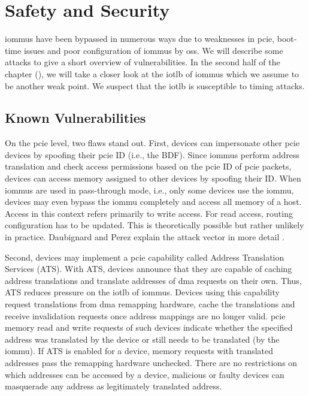\chapter{Safety and Security}
\label{chap:safety_and_security}

\acp{iommu} have been bypassed in numerous ways due to weaknesses in \ac{pcie},
boot-time issues and poor configuration of \acp{iommu} by \acp{os}. We will
describe some attacks to give a short overview of vulnerabilities. In the second
half of the chapter (), we will take a closer look at the
\ac{iotlb} of \acp{iommu} which we assume to be another weak point. We suspect
that the \ac{iotlb} is susceptible to timing attacks.


\section{Known Vulnerabilities}
\label{sec:known_vulnerabilities}

On the \ac{pcie} level, two flaws stand out. First, devices can impersonate
other \ac{pcie} devices by spoofing their \ac{pcie} ID (i.e., the BDF). Since
\acp{iommu} perform address translation and check access permissions based on
the \ac{pcie} ID of \ac{pcie} packets, devices can access memory assigned to
other devices by spoofing their ID. When \acp{iommu} are used in pass-through
mode, i.e., only some devices use the \ac{iommu}, devices may even bypass the
\ac{iommu} completely and access all memory of a host. Access in this context
refers primarily to write access. For read access, routing configuration has to
be updated. This is theoretically possible but rather unlikely in practice.
Daubignard and Perez explain the attack vector in more detail
\cite{daubignard2017protip}.

Second, devices may implement a \ac{pcie} capability called Address Translation
Services (ATS). With ATS, devices announce that they are capable of caching
address translations and translate addresses of \ac{dma} requests on their own.
Thus, ATS reduces pressure on the \ac{iotlb} of \acp{iommu}. Devices using this
capability request translations from \ac{dma} remapping hardware, cache the
translations and receive invalidation requests once address mappings are no
longer valid. \ac{pcie} memory read and write requests of such devices indicate
whether the specified address was translated by the device or still needs to be
translated (by the \ac{iommu}). If ATS is enabled for a device, memory requests
with translated addresses pass the remapping hardware unchecked. There are no
restrictions on which addresses can be accessed by a device, malicious or faulty
devices can masquerade any address as legitimately translated address.

